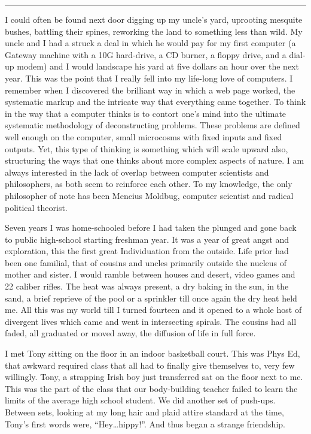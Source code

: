 \documentclass[ebook, 10pt, openright, onecolumn]{memoir}
\newcommand*\td[1]{
  \todo[inline]{
     #1 
  }
}
\newcommand*\starbreak{\fancybreak*{\Large{* * *}}}
\newcommand*\finish{\td{ ----- Finish this section -----}}
\begin{document}
\starbreak

I could often be found next door digging up my uncle's yard, uprooting mesquite
bushes, battling their spines, reworking the land to something less than wild.
My uncle and I had a struck a deal in which he would pay for my first computer
(a Gateway machine with a 10G hard-drive, a CD burner, a floppy drive, and a
dial-up modem) and I would landscape his yard at five dollars an hour over the
next year.  This was the point that I really fell into my life-long love of
computers.  I remember when I discovered the brilliant way in which a web page
worked, the systematic markup and the intricate way that everything came
together.  To think in the way that a computer thinks is to contort one's mind
into the ultimate systematic methodology of deconstructing problems.  These
problems are defined well enough on the computer, small microcosms with fixed
inputs and fixed outputs.  Yet, this type of thinking is something which will
scale upward also, structuring the ways that one thinks about more complex
aspects of nature.  I am always interested in the lack of overlap between
computer scientists and philosophers, as both seem to reinforce each other. To
my knowledge, the only philosopher of note has been Mencius Moldbug, computer
scientist and radical political theorist.  

\finish

Seven years I was home-schooled before I had taken the plunged and gone back to
public high-school starting freshman year.  It was a year of great angst and
exploration, this the first great Individuation from the outside.  Life prior
had been one familial, that of cousins and uncles primarily outside the nucleus
of mother and sister.  I would ramble between houses and desert, video games and
22 caliber rifles.  The heat was always present, a dry baking in the sun, in the
sand, a brief reprieve of the pool or a sprinkler till once again the dry heat
held me.  All this was my world till I turned fourteen and it opened to a whole
host of divergent lives which came and went in intersecting spirals.  The
cousins had all faded, all graduated or moved away, the diffusion of life in
full force.

I met Tony sitting on the floor in an indoor basketball court.  This was Phys
Ed, that awkward required class that all had to finally give themselves to, very
few willingly.  Tony, a strapping Irish boy just transferred sat on the floor
next to me. This was the part of the class that our body-building teacher failed
to learn the limits of the average high school student.  We did another set of
push-ups. Between sets, looking at my long hair and plaid attire standard at the
time, Tony's first words were, ``Hey\ldots hippy!''.  And thus began a strange
friendship.
\end{document}
